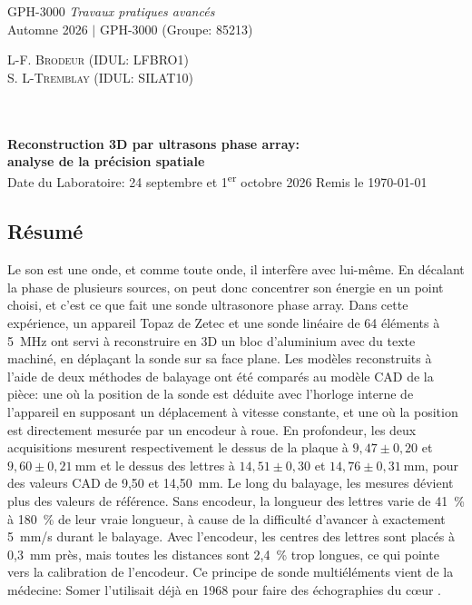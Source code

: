 \documentclass[11pt,letterpaper]{article}
\begin{document}
\thispagestyle{empty} %
\begin{center}

\noindent
\begin{minipage}[t]{0.5\textwidth}
\raggedright
{\large GPH-3000 \textit{Travaux pratiques avancés}}\\
{\large Automne 2026 $\vert$ GPH-3000 (Groupe: 85213)}
\end{minipage}%
\begin{minipage}[t]{0.5\textwidth}
\raggedleft
{\large \textsc{L-F. Brodeur (IDUL: LFBRO1)}}\\
{\large \textsc{S. L-Tremblay (IDUL: SILAT10)}}
\end{minipage}
\\~\\
\vspace{1em}
{\Large \textbf{Reconstruction 3D par ultrasons phase array:} } \\
{\Large \textbf{analyse de la précision spatiale} } \\[0.3em]
{\large Date du Laboratoire: 24 septembre et 1\textsuperscript{er} octobre 2026 \qquad\qquad Remis le \today}

\end{center}

\vspace{0.5em}
\subsection*{Résumé}
Le son est une onde, et comme toute onde, il interfère avec lui-même. En décalant la phase de plusieurs sources, on peut donc concentrer son énergie en un point choisi, et c'est ce que fait une sonde ultrasonore phase array. Dans cette expérience, un appareil Topaz de Zetec et une sonde linéaire de 64 éléments à 5~MHz ont servi à reconstruire en 3D un bloc d'aluminium avec du texte machiné, en déplaçant la sonde sur sa face plane. Les modèles reconstruits à l'aide de deux méthodes de balayage ont été comparés au modèle CAD de la pièce: une où la position de la sonde est déduite avec l'horloge interne de l'appareil en supposant un déplacement à vitesse constante, et une où la position est directement mesurée par un encodeur à roue. En profondeur, les deux acquisitions mesurent respectivement le dessus de la plaque à $9{,}47 \pm 0{,}20$ et $9{,}60 \pm 0{,}21~\text{mm}$ et le dessus des lettres à $14{,}51 \pm 0{,}30$ et $14{,}76 \pm 0{,}31~\text{mm}$, pour des valeurs CAD de 9,50 et 14,50~mm. Le long du balayage, les mesures dévient plus des valeurs de référence. Sans encodeur, la longueur des lettres varie de 41~\% à 180~\% de leur vraie longueur, à cause de la difficulté d'avancer à exactement 5~mm/s durant le balayage. Avec l'encodeur, les centres des lettres sont placés à 0,3~mm près, mais toutes les distances sont 2,4~\% trop longues, ce qui pointe vers la calibration de l'encodeur. Ce principe de sonde multiéléments vient de la médecine: Somer l'utilisait déjà en 1968 pour faire des échographies du c\oe ur \cite{somer}.
\end{document}
